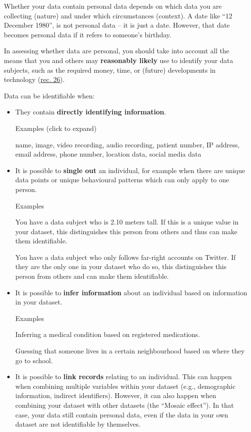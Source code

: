 \documentclass[
]{book}
\providecommand{\tightlist}{%
  \setlength{\itemsep}{0pt}\setlength{\parskip}{0pt}}
\begin{document}
Whether your data contain personal data depends on which data you are
collecting (nature) and under which circumstances (context). A date like
``12 December 1980'', is not personal data -- it is just a date. However, that
date becomes personal data if it refers to someone's birthday.

In assessing whether data are personal, you should take into account all the
means that you and others may \textbf{reasonably likely} use to identify your data
subjects, such as the required money, time, or (future) developments in
technology (\href{https://gdpr-info.eu/recitals/no-26/}{rec. 26}).

Data can be identifiable when:

\begin{itemize}
\tightlist
\item
  They contain \textbf{directly identifying information}.

  Examples (click to expand)

  name, image, video recording, audio recording, patient number, IP address,
  email address, phone number, location data, social media data
\item
  It is possible to \textbf{single out} an individual, for example when there are
  unique data points or unique behavioural patterns which can only apply to one
  person.

  Examples

  You have a data subject who is 2.10 meters tall. If this is a unique
  value in your dataset, this distinguishes this person from others and thus
  can make them identifiable.

  You have a data subject who only follows far-right accounts on Twitter.
  If they are the only one in your dataset who do so, this distinguishes this
  person from others and can make them identifiable.
\item
  It is possible to \textbf{infer information} about an individual based on information
  in your dataset.

  Examples

  Inferring a medical condition based on registered medications.

  Guessing that someone lives in a certain neighbourhood based on where they go to school.
\item
  It is possible to \textbf{link records} relating to an individual. This can happen
  when combining multiple variables within your dataset (e.g., demographic
  information, indirect identifiers). However, it can also happen when combining
  your dataset with other datasets (the ``Mosaic effect''). In that case, your data
  still contain personal data, even if the data in your own dataset are not
  identifiable by themselves.


\end{itemize}
\end{document}
